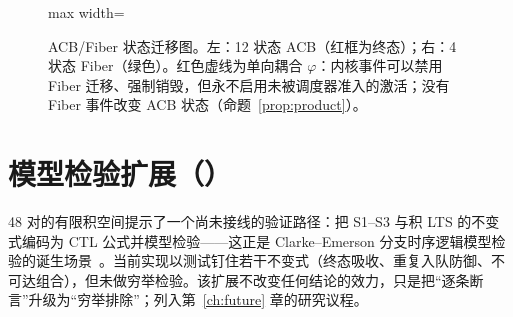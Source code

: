 \begin{figure}[htbp]
\begin{adjustbox}{max width=\textwidth}
\end{adjustbox}
\caption{ACB/Fiber 状态迁移图。左：12 状态 ACB（红框为终态）；右：4 状态 Fiber（绿色）。红色虚线为单向耦合 $\varphi$：内核事件可以禁用 Fiber 迁移、强制销毁，但永不启用未被调度器准入的激活；没有 Fiber 事件改变 ACB 状态（命题~\ref{prop:product}）。}
\label{fig:states}
\end{figure}

\section{模型检验扩展（\PROPOSED）}\label{sec:modelcheck}

48 对的有限积空间提示了一个尚未接线的验证路径：把 S1--S3 与积 LTS 的不变式编码为 CTL 公式并模型检验——这正是 Clarke--Emerson 分支时序逻辑模型检验的诞生场景~\cite{clarke1981}。当前实现以测试钉住若干不变式（终态吸收、重复入队防御、不可达组合），但未做穷举检验。该扩展不改变任何结论的效力，只是把“逐条断言”升级为“穷举排除”；列入第~\ref{ch:future} 章的研究议程。
